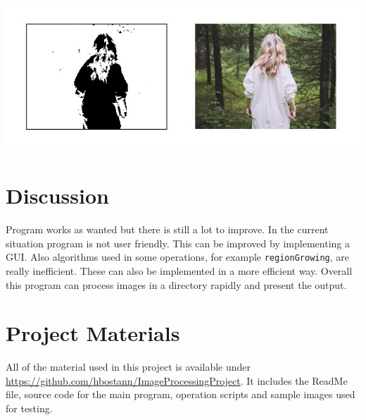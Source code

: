 \documentclass[conference,compsoc]{IEEEtran}
\begin{document}
\begin{minipage}{0.48\linewidth}
\includegraphics[scale=.5]{Untitled3.png}
\end{minipage}


\section{Discussion}
Program works as wanted but there is still a lot to improve. In the current situation program is not user friendly. This can be improved by implementing a GUI. Also algorithms used in some operations, for example \texttt{regionGrowing}, are really inefficient. These can also be implemented in a more efficient way. Overall this program can process images in a directory rapidly and present the output.

\section{Project Materials}
All of the material used in this project is available under \url{https://github.com/hbostann/ImageProcessingProject}.
It includes the ReadMe file, source code for the main program, operation scripts and sample images used for testing.

\pagebreak
\end{document}
